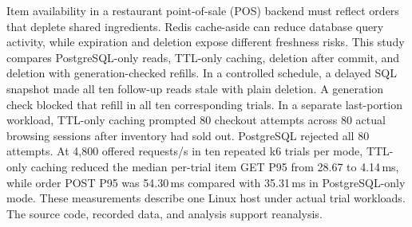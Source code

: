 Item availability in a restaurant point-of-sale (POS) backend must reflect orders that deplete shared ingredients. Redis cache-aside can reduce database query activity, while expiration and deletion expose different freshness risks. This study compares PostgreSQL-only reads, TTL-only caching, deletion after commit, and deletion with generation-checked refills. In a controlled schedule, a delayed SQL snapshot made all ten follow-up reads stale with plain deletion. A generation check blocked that refill in all ten corresponding trials. In a separate last-portion workload, TTL-only caching prompted 80 checkout attempts across 80 actual browsing sessions after inventory had sold out. PostgreSQL rejected all 80 attempts. At 4{,}800 offered requests/s in ten repeated k6 trials per mode, TTL-only caching reduced the median per-trial item GET P95 from 28.67 to 4.14\,ms, while order POST P95 was 54.30\,ms compared with 35.31\,ms in PostgreSQL-only mode. These measurements describe one Linux host under actual trial workloads. The source code, recorded data, and analysis support reanalysis.
